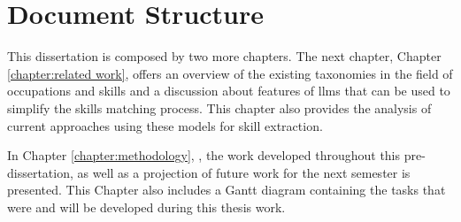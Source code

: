 \section{Document Structure}

This dissertation is composed by two more chapters.
The next chapter, Chapter \ref{chapter:related work},  offers an overview of the existing taxonomies in the field of occupations and skills and a discussion about features of \acl{llms} that can be used to simplify the skills matching process. This chapter also provides the analysis of current approaches using these models for skill extraction.

In Chapter \ref{chapter:methodology}, , the work developed throughout this pre-dissertation, as well as a projection of future work for the next semester is presented. This Chapter also includes a Gantt diagram containing the tasks that were and will be developed during this thesis work.